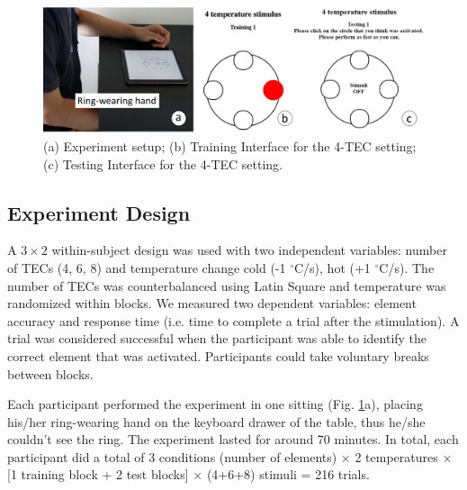 \documentclass[preprint,12pt]{elsarticle}
\begin{document}
\begin{figure}[tp]
  \centering
  \includegraphics[width=0.8\columnwidth]{img/fig5.png}
  \caption{(a) Experiment setup; (b) Training Interface for the 4-TEC setting; (c) Testing Interface for the 4-TEC setting.}
  \label{fig:5}
\end{figure}

\subsection{Experiment Design}
A $3 \times 2$ within-subject design was used with two independent variables: number of TECs (4, 6, 8) and temperature change {cold (-1 $^{\circ}$C/s), hot (+1 $^{\circ}$C/s)}. The number of TECs was counterbalanced using Latin Square and temperature was randomized within blocks. We measured two dependent variables: element accuracy and response time (i.e. time to complete a trial after the stimulation). A trial was considered successful when the participant was able to identify the correct element that was activated. Participants could take voluntary breaks between blocks.

Each participant performed the experiment in one sitting (Fig. \ref{fig:5}a), placing his/her ring-wearing hand on the keyboard drawer of the table, thus he/she couldn't see the ring. The experiment lasted for around 70 minutes. In total, each participant did a total of 3 conditions (number of elements) $\times$ 2 temperatures $\times$ [1 training block + 2 test blocks] $\times$ (4+6+8) stimuli = 216 trials.

\end{document}
